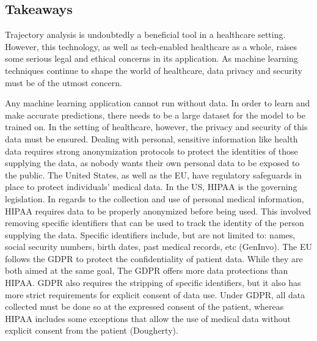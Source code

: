 \documentclass{article}
\begin{document}
\subsection{Takeaways}
Trajectory analysis is undoubtedly a beneficial tool in a healthcare setting.  However, this technology, as well as tech-enabled healthcare as a whole, raises some serious legal and ethical concerns in its application.  As machine learning techniques continue to shape the world of healthcare, data privacy and security must be of the utmost concern.

Any machine learning application cannot run without data.  In order to learn and make accurate predictions, there needs to be a large dataset for the model to be trained on.  In the setting of healthcare, however, the privacy and security of this data must be ensured.  Dealing with personal, sensitive information like health data requires strong anonymization protocols to protect the identities of those supplying the data, as nobody wants their own personal data to be exposed to the public.  The United States, as well as the EU, have regulatory safeguards in place to protect individuals’ medical data.  In the US, HIPAA is the governing legislation.  In regards to the collection and use of personal medical information, HIPAA requires data to be properly anonymized before being used.  This involved removing specific identifiers that can be used to track the identity of the person supplying the data.  Specific identifiers include, but are not limited to: names, social security numbers, birth dates, past medical records, etc (GenInvo).  The EU follows the GDPR to protect the confidentiality of patient data.  While they are both aimed at the same goal, The GDPR offers more data protections than HIPAA.  GDPR also requires the stripping of specific identifiers, but it also has more strict requirements for explicit consent of data use.  Under GDPR, all data collected must be done so at the expressed consent of the patient, whereas HIPAA includes some exceptions that allow the use of medical data without explicit consent from the patient (Dougherty).
\end{document}
